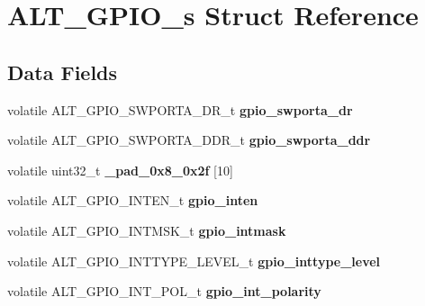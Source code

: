 \hypertarget{structALT__GPIO__s}{}\section{A\+L\+T\+\_\+\+G\+P\+I\+O\+\_\+s Struct Reference}
\label{structALT__GPIO__s}
\subsection*{Data Fields}
\begin{DoxyCompactItemize}
\item 
\mbox{\label{structALT__GPIO__s_abdbe92c22923ed6f9be56131990854cb}} 
volatile A\+L\+T\+\_\+\+G\+P\+I\+O\+\_\+\+S\+W\+P\+O\+R\+T\+A\+\_\+\+D\+R\+\_\+t {\bfseries gpio\+\_\+swporta\+\_\+dr}
\item 
\mbox{\label{structALT__GPIO__s_a5b12b05e2d4a3f092eb7bdbed037dff2}} 
volatile A\+L\+T\+\_\+\+G\+P\+I\+O\+\_\+\+S\+W\+P\+O\+R\+T\+A\+\_\+\+D\+D\+R\+\_\+t {\bfseries gpio\+\_\+swporta\+\_\+ddr}
\item 
\mbox{\label{structALT__GPIO__s_a7f4118ed82389677e630db70a2d6dde3}} 
volatile uint32\+\_\+t {\bfseries \+\_\+pad\+\_\+0x8\+\_\+0x2f} \mbox{[}10\mbox{]}
\item 
\mbox{\label{structALT__GPIO__s_a7e166907ab801aa785736855d0ecb353}} 
volatile A\+L\+T\+\_\+\+G\+P\+I\+O\+\_\+\+I\+N\+T\+E\+N\+\_\+t {\bfseries gpio\+\_\+inten}
\item 
\mbox{\label{structALT__GPIO__s_ac00cf78e0000589a0afed87f0a7b3aa6}} 
volatile A\+L\+T\+\_\+\+G\+P\+I\+O\+\_\+\+I\+N\+T\+M\+S\+K\+\_\+t {\bfseries gpio\+\_\+intmask}
\item 
\mbox{\label{structALT__GPIO__s_ad0774c7cbb0c02589080088eb9804b5a}} 
volatile A\+L\+T\+\_\+\+G\+P\+I\+O\+\_\+\+I\+N\+T\+T\+Y\+P\+E\+\_\+\+L\+E\+V\+E\+L\+\_\+t {\bfseries gpio\+\_\+inttype\+\_\+level}
\item 
\mbox{\label{structALT__GPIO__s_a9c7a5e1aa8b30adc8c6c9e1bed74e343}} 
volatile A\+L\+T\+\_\+\+G\+P\+I\+O\+\_\+\+I\+N\+T\+\_\+\+P\+O\+L\+\_\+t {\bfseries gpio\+\_\+int\+\_\+polarity}
\item 

\end{DoxyCompactItemize}
